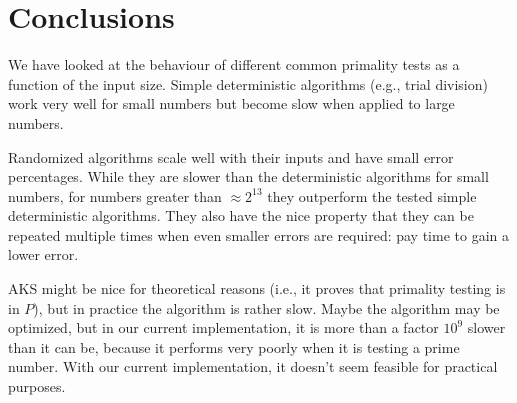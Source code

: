 \section{Conclusions}


We have looked at the behaviour of different common primality tests as a function of the input size.
Simple deterministic algorithms (e.g., trial division) work very well for small numbers but become slow when applied to large numbers.

Randomized algorithms scale well with their inputs and have small error percentages.
While they are slower than the deterministic algorithms for small numbers,
for numbers greater than $\approx 2^{13}$ they outperform the tested simple deterministic algorithms.
They also have the nice property that they can be repeated multiple times when even smaller errors are required: pay time to gain a lower error.

AKS might be nice for theoretical reasons (i.e., it proves that primality testing is in $P$), but in practice the algorithm is rather slow.
Maybe the algorithm may be optimized, but in our current implementation, it is more than a factor $10^9$ slower than it can be,
because it performs very poorly when it is testing a prime number.
With our current implementation, it doesn't seem feasible for practical purposes.
